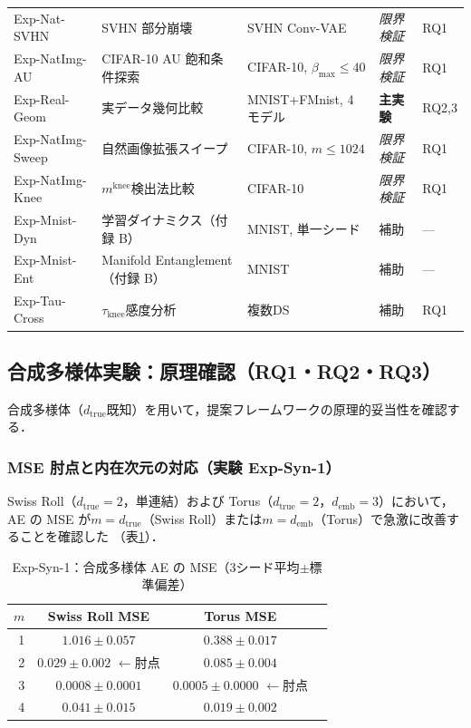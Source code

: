 \documentclass[11pt,a4paper]{jsarticle}
\newcommand{\dtrue}{d_{\mathrm{true}}}
\newcommand{\mknee}{m^{\mathrm{knee}}}
\newcommand{\demb}{d_{\mathrm{emb}}}
\begin{document}
\begin{table}[H]
\begin{tabular}{p{3.5cm}p{4.5cm}p{3.5cm}p{2.0cm}p{1.5cm}}
Exp-Nat-SVHN & SVHN 部分崩壊 & SVHN Conv-VAE & \textit{限界検証} & RQ1 \\
Exp-NatImg-AU & CIFAR-10 AU 飽和条件探索 & CIFAR-10, $\beta_{\max}\leq40$ & \textit{限界検証} & RQ1 \\
Exp-Real-Geom & 実データ幾何比較 & MNIST+FMnist, 4モデル & \textbf{主実験} & RQ2,3 \\
Exp-NatImg-Sweep & 自然画像拡張スイープ & CIFAR-10, $m\leq1024$ & \textit{限界検証} & RQ1 \\
Exp-NatImg-Knee & $\mknee$検出法比較 & CIFAR-10 & \textit{限界検証} & RQ1 \\
Exp-Mnist-Dyn & 学習ダイナミクス（付録 B） & MNIST, 単一シード & 補助 & --- \\
Exp-Mnist-Ent & Manifold Entanglement（付録 B） & MNIST & 補助 & --- \\
Exp-Tau-Cross & $\tau_\mathrm{knee}$感度分析 & 複数DS & 補助 & RQ1 \\
\bottomrule
\end{tabular}
\end{table}

\subsection{合成多様体実験：原理確認（RQ1・RQ2・RQ3）}\label{sec:exp_synthetic}

合成多様体（$\dtrue$既知）を用いて，提案フレームワークの原理的妥当性を確認する．

\subsubsection{MSE 肘点と内在次元の対応（実験 Exp-Syn-1）}

Swiss Roll（$\dtrue = 2$，単連結）および Torus（$\dtrue = 2$，$\demb = 3$）において，
AE の MSE が$m = \dtrue$（Swiss Roll）または$m = \demb$（Torus）で急激に改善することを確認した
（表\ref{tab:e1}）．

\begin{table}[H]
\centering
\caption{Exp-Syn-1：合成多様体 AE の MSE（3シード平均$\pm$標準偏差）}
\label{tab:e1}
\small
\begin{tabular}{rccc}
\toprule
$m$ & Swiss Roll MSE & Torus MSE \\
\midrule
1 & $1.016\pm0.057$ & $0.388\pm0.017$ \\
2 & $\boldsymbol{0.029\pm0.002}$ $\leftarrow$肘点 & $0.085\pm0.004$ \\
3 & $0.0008\pm0.0001$ & $\boldsymbol{0.0005\pm0.0000}$ $\leftarrow$肘点 \\
4 & $0.041\pm0.015$ & $0.019\pm0.002$ \\
\bottomrule
\end{tabular}
\end{table}
\end{document}
